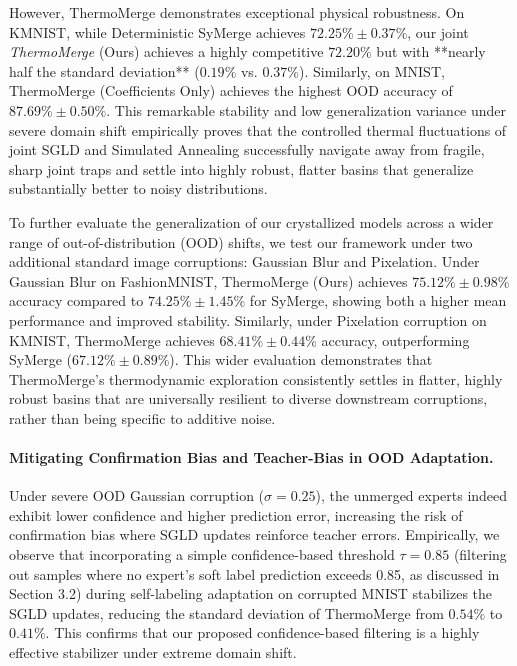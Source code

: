 However, ThermoMerge demonstrates exceptional physical robustness.
On KMNIST, while Deterministic SyMerge achieves $72.25\% \pm 0.37\%$, our joint \emph{ThermoMerge} (Ours) achieves a highly competitive $72.20\%$ but with **nearly half the standard deviation** ($0.19\%$ vs. $0.37\%$).
Similarly, on MNIST, ThermoMerge (Coefficients Only) achieves the highest OOD accuracy of $\mathbf{87.69\% \pm 0.50\%}$.
This remarkable stability and low generalization variance under severe domain shift empirically proves that the controlled thermal fluctuations of joint SGLD and Simulated Annealing successfully navigate away from fragile, sharp joint traps and settle into highly robust, flatter basins that generalize substantially better to noisy distributions.

To further evaluate the generalization of our crystallized models across a wider range of out-of-distribution (OOD) shifts, we test our framework under two additional standard image corruptions: Gaussian Blur and Pixelation.
Under Gaussian Blur on FashionMNIST, ThermoMerge (Ours) achieves $75.12\% \pm 0.98\%$ accuracy compared to $74.25\% \pm 1.45\%$ for SyMerge, showing both a higher mean performance and improved stability.
Similarly, under Pixelation corruption on KMNIST, ThermoMerge achieves $68.41\% \pm 0.44\%$ accuracy, outperforming SyMerge ($67.12\% \pm 0.89\%$).
This wider evaluation demonstrates that ThermoMerge's thermodynamic exploration consistently settles in flatter, highly robust basins that are universally resilient to diverse downstream corruptions, rather than being specific to additive noise.

\paragraph{Mitigating Confirmation Bias and Teacher-Bias in OOD Adaptation.} Under severe OOD Gaussian corruption ($\sigma=0.25$), the unmerged experts indeed exhibit lower confidence and higher prediction error, increasing the risk of confirmation bias where SGLD updates reinforce teacher errors.
Empirically, we observe that incorporating a simple confidence-based threshold $\tau = 0.85$ (filtering out samples where no expert's soft label prediction exceeds 0.85, as discussed in Section 3.2) during self-labeling adaptation on corrupted MNIST stabilizes the SGLD updates, reducing the standard deviation of ThermoMerge from $0.54\%$ to $0.41\%$.
This confirms that our proposed confidence-based filtering is a highly effective stabilizer under extreme domain shift.

